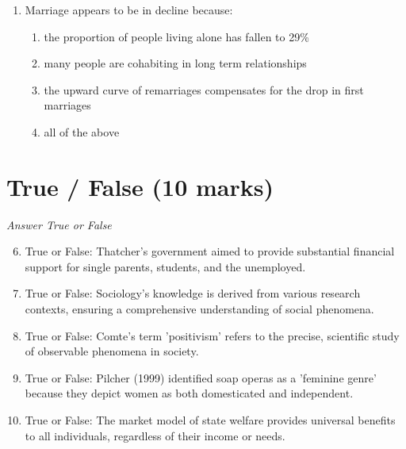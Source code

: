 \documentclass[12pt]{article}
\begin{document}
\begin{enumerate}[label=\arabic*.]
\begin{enumerate}[label=(\alph*)]
    \item Prime Minister, Archbishop of York, Viscounts of England
    \item Marquesses of England, Earls of Great Britain, King's Brothers
    \item Esquires, Serjeants of Law, Dukes' Eldest Sons
    \item King's Grandsons, Lord High Treasurer, Companions of the Bath
\end{enumerate}
\item Marriage appears to be in decline because:
\begin{enumerate}[label=(\alph*)]
    \item the proportion of people living alone has fallen to 29\%
    \item many people are cohabiting in long term relationships
    \item the upward curve of remarriages compensates for the drop in first marriages
    \item all of the above
\end{enumerate}
\end{enumerate}

\section*{True / False (10 marks)}
\textit{Answer True or False}
\begin{enumerate}[label=\arabic*.]
\setcounter{enumi}{5}
\item True or False: Thatcher's government aimed to provide substantial financial support for single parents, students, and the unemployed.
\item True or False: Sociology's knowledge is derived from various research contexts, ensuring a comprehensive understanding of social phenomena.
\item True or False: Comte's term 'positivism' refers to the precise, scientific study of observable phenomena in society.
\item True or False: Pilcher (1999) identified soap operas as a 'feminine genre' because they depict women as both domesticated and independent.
\item True or False: The market model of state welfare provides universal benefits to all individuals, regardless of their income or needs.
\end{enumerate}
\end{document}
